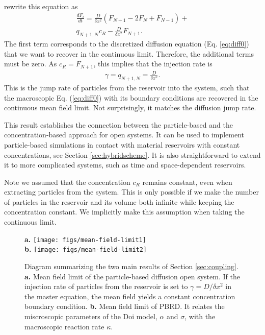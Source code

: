 \documentclass[10pt,twocolumn]{revtex4-1}
\begin{document}
	rewrite this equation as
	\begin{align*}
	\frac{dF_{i}}{dt}=\frac{D}{\delta x^{2}}(F_{N+1}-2F_{N}+F_{N-1})+ \\
	q_{N+1,N}c_R-\frac{D}{\delta x^{2}}F_{N+1}.
	\end{align*}
	The first term corresponds to the discretized diffusion equation (Eq. \ref{eq:diff0}) that we want to recover in the continuous limit. Therefore, the additional terms must be zero. As $c_R = F_{N+1}$, this implies that the injection rate is
	\begin{align}
	\gamma =q_{N+1,N} = \frac{D}{\delta x^2}.
	\label{eq:gammarate}
	\end{align}
	This is the jump rate of particles from the reservoir into the system, such that the macroscopic Eq. (\ref{eq:diff0}) with its boundary conditions are recovered in the continuous mean field limit. Not surprisingly, it matches the diffusion jump rate.
	
	This result establishes the connection between the particle-based and the concentration-based approach for open systems. It can be used to implement particle-based simulations in contact with material reservoirs with constant concentrations, see Section \ref{sec:hybridscheme}. It is also straightforward to extend it to more complicated systems, such as time and space-dependent reservoirs.
	
	Note we assumed that the concentration $c_R$ remains constant, even when extracting particles from the system. This is only possible if we make the number of particles in the reservoir and its volume both infinite while keeping the concentration constant. We implicitly make this assumption when taking the continuous limit.
	
	\begin{figure}
		\textbf{a.} \texttt{[image: figs/mean-field-limit1]} \\
		\textbf{b.} \texttt{[image: figs/mean-field-limit2]}
		\caption{Diagram summarizing the two main results of Section \ref{sec:coupling}. \textbf{a.} Mean field limit of the particle-based diffusion open system. If the injection rate of particles from the reservoir is set to $\gamma = D/\delta x^2$ in the master equation, the mean field yields a constant concentration boundary condition. \textbf{b.} Mean field limit of PBRD. It relates the miscroscopic parameters of the Doi model, $\alpha$ and $\sigma$, with the macroscopic reaction rate $\kappa$. }
		\label{fig:meanFields}
	\end{figure}
	
\end{document}
